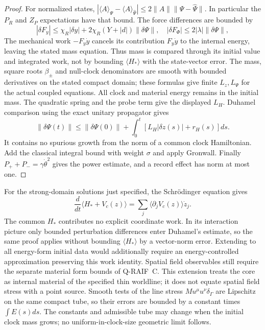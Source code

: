 \begin{proof}
For normalized states,
$|\langle A\rangle_\Psi-\langle A\rangle_{\widehat\Psi}|
\le2\|A\|\|\Psi-\widehat\Psi\|$.
In particular the $P_R$ and $Z_P$ expectations have that bound.
The force differences are bounded by
\[
 |\delta F_y|\le\chi_R|\delta y|
       +2\chi_R(Y+|d|)\|\delta\Psi\|,\quad
 |\delta F_\Phi|\le2|\lambda|\|\delta\Psi\|,
\]
The mechanical work $-F_y\dot y$ cancels its contribution
$F_y\dot y$ to the internal energy, leaving the stated mass equation.
Thus mass is compared through its initial value and integrated work,
not by bounding $\langle H_*\rangle$ with the state-vector error.
The mass, square roots $\beta_\pm$ and null-clock denominators
are smooth with bounded derivatives on the stated compact domain;
these formulas give finite $L_z,L_\Psi$ for the actual coupled
equations. All clock and material energy remains in the initial mass.
The quadratic spring and the probe term give the displayed $L_H$.
Duhamel comparison using the exact unitary propagator gives
\[
 \|\delta\Psi(t)\|\le\|\delta\Psi(0)\|
    +\int_0^t[L_H|\delta z(s)|+r_H(s)]ds.
\]
It contains no spurious growth from the norm of a common clock
Hamiltonian. Add the classical integral bound with weight $\sigma$
and apply Gronwall. Finally $P_++P_-=\gamma\dot\theta^2$ gives
the power estimate, and a record effect has norm at most one.
\end{proof}

For the strong-domain solutions just specified, the Schr\"odinger
equation gives
\[
 \frac{d}{dt}\langle H_*+V_c(z)\rangle
 =\sum_j\langle\partial_jV_c(z)\rangle\dot z_j.
\]
The common $H_*$ contributes no explicit coordinate work. In its
interaction picture only bounded perturbation differences enter
Duhamel's estimate, so the same proof applies without bounding
$\langle H_*\rangle$ by a vector-norm error. Extending to all
energy-form initial data would additionally require an energy-controlled
approximation preserving this work identity. Spatial field observables
still require the separate material form bounds of Q-RAIF~C.
This extension treats the core as internal material of the specified
thin worldline; it does not equate spatial field stress with a point
source. Smooth tests of the line stress
$M u^\mu u^\nu\delta_\Gamma$ are Lipschitz on the same compact tube,
so their errors are bounded by a constant times $\int E(s)ds$.
The constants and admissible tube may change when the initial clock
mass grows; no uniform-in-clock-size geometric limit follows.

